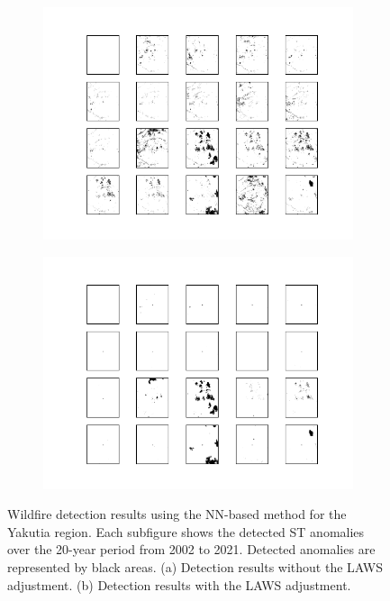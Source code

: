 \documentclass[11pt]{article}
\begin{document}
\begin{figure}[H]
     \centering
     
      \begin{subfigure}[b]{0.45\textwidth}
		\centering
		\includegraphics[width=\textwidth]{../figure/nn_no_laws.png}
		\caption{}
	 \end{subfigure}
         \hfill
      \begin{subfigure}[b]{0.45\textwidth}
         \includegraphics[width=\textwidth]{../figure/nn_laws.png}
         \caption{}
     \end{subfigure}
         \caption{Wildfire detection results using the NN-based method for the Yakutia region. Each subfigure shows the detected ST anomalies over the 20-year period from 2002 to 2021. Detected anomalies are represented by black areas. (a) Detection results without the LAWS adjustment. (b) Detection results with the LAWS adjustment.}
      \label{fig: nn_real_data}
\end{figure}
\end{document}

